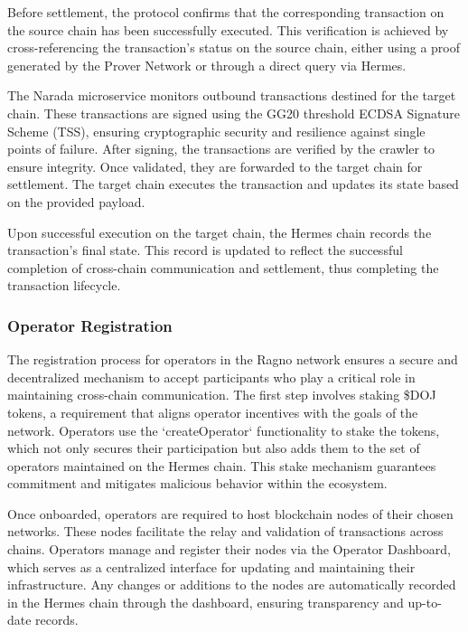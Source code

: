 Before settlement, the protocol confirms that the corresponding transaction on the source chain has been successfully executed. This verification is achieved by cross-referencing the transaction’s status on the source chain, either using a proof generated by the Prover Network or through a direct query via Hermes.

The Narada microservice monitors outbound transactions destined for the target chain. These transactions are signed using the GG20 threshold ECDSA Signature Scheme (TSS), ensuring cryptographic security and resilience against single points of failure. After signing, the transactions are verified by the crawler to ensure integrity. Once validated, they are forwarded to the target chain for settlement. The target chain executes the transaction and updates its state based on the provided payload.

Upon successful execution on the target chain, the Hermes chain records the transaction's final state. This record is updated to reflect the successful completion of cross-chain communication and settlement, thus completing the transaction lifecycle.

\subsubsection{Operator Registration}

The registration process for operators in the Ragno network ensures a secure and decentralized mechanism to accept participants who play a critical role in maintaining cross-chain communication. The first step involves staking \$DOJ tokens, a requirement that aligns operator incentives with the goals of the network. Operators use the `\textsf{createOperator}` functionality to stake the tokens, which not only secures their participation but also adds them to the set of operators maintained on the Hermes chain. This stake mechanism guarantees commitment and mitigates malicious behavior within the ecosystem.  

Once onboarded, operators are required to host blockchain nodes of their chosen networks. These nodes facilitate the relay and validation of transactions across chains. Operators manage and register their nodes via the Operator Dashboard, which serves as a centralized interface for updating and maintaining their infrastructure. Any changes or additions to the nodes are automatically recorded in the Hermes chain through the dashboard, ensuring transparency and up-to-date records.  

